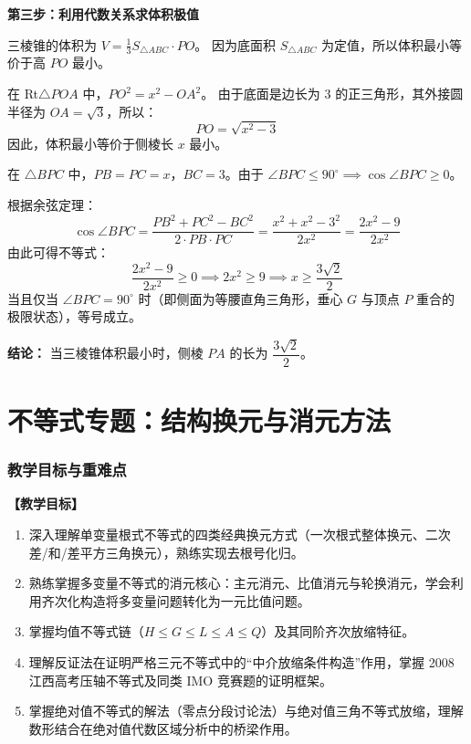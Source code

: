 \documentclass[11pt,a4paper]{ctexart}
\begin{document}
\begin{proof*}
\vspace{0.3cm}
\textbf{第三步：利用代数关系求体积极值}\par
三棱锥的体积为 $V = \frac{1}{3} S_{\triangle ABC} \cdot PO$。
因为底面积 $S_{\triangle ABC}$ 为定值，所以体积最小等价于高 $PO$ 最小。\par
在 Rt$\triangle POA$ 中，$PO^2 = x^2 - OA^2$。
由于底面是边长为 3 的正三角形，其外接圆半径为 $OA = \sqrt{3}$，所以：
\[ PO = \sqrt{x^2 - 3} \]
因此，体积最小等价于侧棱长 $x$ 最小。\par
在 $\triangle BPC$ 中，$PB = PC = x$，$BC = 3$。由于 $\angle BPC \le 90^\circ \implies \cos\angle BPC \ge 0$。\par
根据余弦定理：
\[ \cos\angle BPC = \frac{PB^2 + PC^2 - BC^2}{2 \cdot PB \cdot PC} = \frac{x^2 + x^2 - 3^2}{2x^2} = \frac{2x^2 - 9}{2x^2} \]
由此可得不等式：
\[ \frac{2x^2 - 9}{2x^2} \ge 0 \implies 2x^2 \ge 9 \implies x \ge \frac{3\sqrt{2}}{2} \]
当且仅当 $\angle BPC = 90^\circ$ 时（即侧面为等腰直角三角形，垂心 $G$ 与顶点 $P$ 重合的极限状态），等号成立。

\vspace{0.2cm}
\noindent\textbf{结论：} 当三棱锥体积最小时，侧棱 $PA$ 的长为 $\dfrac{3\sqrt{2}}{2}$。
\end{proof*}




\newpage
\part{不等式专题：结构换元与消元方法}

\section{教学目标与重难点}
\textbf{【教学目标】}
\begin{enumerate}[label=\arabic*. , leftmargin=2em, itemsep=0.1em, topsep=0.2em]
  \item 深入理解单变量根式不等式的四类经典换元方式（一次根式整体换元、二次差/和/差平方三角换元），熟练实现去根号化归。
  \item 熟练掌握多变量不等式的消元核心：主元消元、比值消元与轮换消元，学会利用齐次化构造将多变量问题转化为一元比值问题。
  \item 掌握均值不等式链（\(H \leqslant G \leqslant L \leqslant A \leqslant Q\)）及其同阶齐次放缩特征。
  \item 理解反证法在证明严格三元不等式中的“中介放缩条件构造”作用，掌握 2008 江西高考压轴不等式及同类 IMO 竞赛题的证明框架。
  \item 掌握绝对值不等式的解法（零点分段讨论法）与绝对值三角不等式放缩，理解数形结合在绝对值代数区域分析中的桥梁作用。
\end{enumerate}
\end{document}
